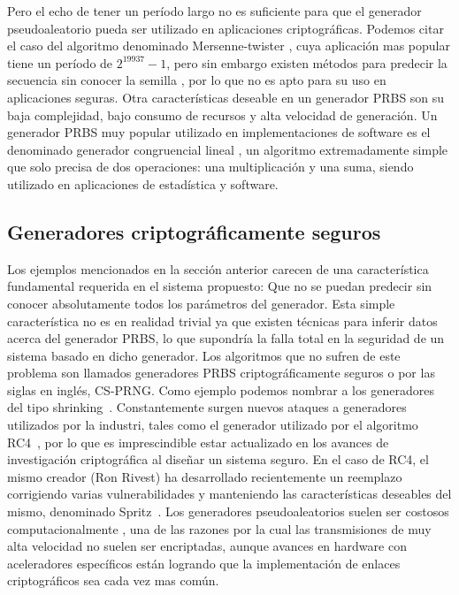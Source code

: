 Pero el echo de tener un período largo no es suficiente para que el generador pseudoaleatorio pueda ser utilizado en aplicaciones criptográficas. Podemos citar el caso del algoritmo denominado Mersenne-twister \cite{matsumoto1998mersenne}, cuya aplicación mas popular tiene un período de $2^{19937}-1$, pero sin embargo existen métodos para predecir la secuencia sin conocer la semilla \cite{argyros2012forgot}, por lo que no es apto para su uso en aplicaciones seguras.
Otra características deseable en un generador PRBS son su baja complejidad, bajo consumo de recursos y alta velocidad de generación. Un generador PRBS muy popular utilizado en implementaciones de software es el denominado generador congruencial lineal \cite{park1988random}, un algoritmo extremadamente simple que solo precisa de dos operaciones: una multiplicación y una suma, siendo utilizado en aplicaciones de estadística y software.

\subsection{Generadores criptográficamente seguros}

Los ejemplos mencionados en la sección anterior carecen de una característica fundamental requerida en el sistema propuesto: Que no se puedan predecir sin conocer absolutamente todos los parámetros del generador. Esta simple característica no es en realidad trivial ya que existen técnicas \cite{argyros2012forgot} para inferir datos acerca del generador PRBS, lo que supondría la falla total en la seguridad de un sistema basado en dicho generador. Los algoritmos que no sufren de este problema son llamados generadores PRBS criptográficamente seguros o por las siglas en inglés, CS-PRNG. Como ejemplo podemos nombrar a los generadores del tipo shrinking~\cite{coppersmith1994shrinking}.
Constantemente surgen nuevos ataques a generadores utilizados por la industri, tales como el generador utilizado por el algoritmo RC4~\cite{vaudenay2007passive}, por lo que es imprescindible estar actualizado en los avances de investigación criptográfica al diseñar un sistema seguro. En el caso de RC4, el mismo creador (Ron Rivest) ha desarrollado recientemente un reemplazo corrigiendo varias vulnerabilidades y manteniendo las características deseables del mismo, denominado Spritz~\cite{RS14}. Los generadores pseudoaleatorios suelen ser costosos computacionalmente , una de las razones por la cual las transmisiones de muy alta velocidad no suelen ser encriptadas, aunque avances en hardware con aceleradores específicos \cite{firasta2008intel} están logrando que la implementación de enlaces criptográficos sea cada vez mas común.

